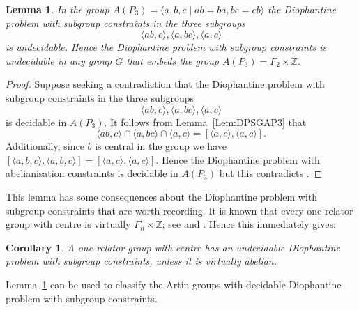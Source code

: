 \documentclass[11pt]{amsart}
\newtheorem{lem}[theorem]{Lemma}
\newtheorem{cor}[theorem]{Corollary}
\theoremstyle{definition}
\numberwithin{theorem}{section}
\newcommand{\Z}{\mathbb{Z}}
\begin{document}
\begin{lem}\label{lem:AP3DPG} In the group \(A(P_3) = \langle a, b, c \mid ab = ba, bc = cb \rangle\) the Diophantine problem with subgroup constraints in the three subgroups
\[
  \langle ab, c \rangle,
  \langle a, bc \rangle,
  \langle a, c \rangle 
\]
is undecidable. Hence the Diophantine problem with subgroup constraints is undecidable in any group $G$ that embeds the group $A(P_3) = F_2 \times \Z$.  
  \end{lem}
\begin{proof} Suppose seeking a contradiction that the Diophantine problem with subgroup constraints in the three subgroups
\[
  \langle ab, c \rangle,
  \langle a, bc \rangle,
  \langle a, c \rangle 
\]
is decidable in $A(P_3)$. It follows from Lemma~\ref{Lem:DPSGAP3} that 
\[
\langle ab, c \rangle \cap
    \langle a, bc \rangle \cap \langle a, c \rangle = [\langle a, c \rangle,
    \langle a, c \rangle].
\]
Additionally, since $b$ is central in the group we have  \([\langle a,b,c \rangle, \langle a,b,c \rangle] = [\langle a, c \rangle, \langle a, c \rangle]\). Hence the Diophantine problem with abelianisation constraints is decidable in $A(P_3)$ but this contradicts \cite[Theorem A]{CiobanuGarreta}. \end{proof}

This lemma has some consequences about the Diophantine problem with subgroup constraints that are worth recording. It is known that every one-relator group with centre is virtually $F_n \times \Z$; 
see \cite{Pietrowski1974} and  \cite[Proposition 4.1]{levitt2015generalized}.
Hence this immediately gives:    

\begin{cor} A one-relator group with centre has an undecidable Diophantine problem with subgroup constraints, unless it is virtually abelian. \end{cor}

Lemma~\ref{lem:AP3DPG} can be used to classify the Artin groups with decidable Diophantine problem with subgroup constraints.   
\end{document}
